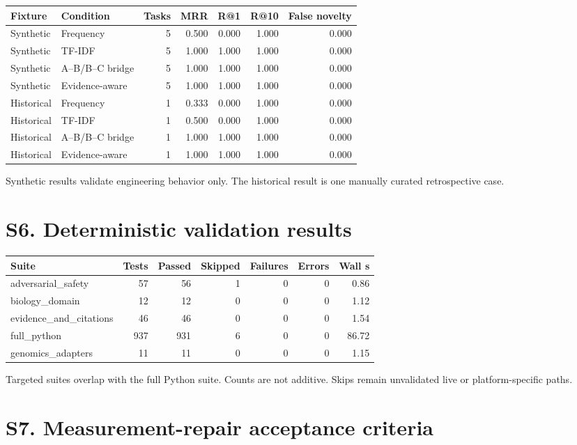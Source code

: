 \documentclass[11pt]{article}
\begin{document}
\begin{tabular*}{\textwidth}{@{\extracolsep{\fill}}llrrrrr}
\toprule
Fixture & Condition & Tasks & MRR & R@1 & R@10 & False novelty \\
\midrule
Synthetic & Frequency & 5 & 0.500 & 0.000 & 1.000 & 0.000 \\
Synthetic & TF-IDF & 5 & 1.000 & 1.000 & 1.000 & 0.000 \\
Synthetic & A--B/B--C bridge & 5 & 1.000 & 1.000 & 1.000 & 0.000 \\
Synthetic & Evidence-aware & 5 & 1.000 & 1.000 & 1.000 & 0.000 \\
Historical & Frequency & 1 & 0.333 & 0.000 & 1.000 & 0.000 \\
Historical & TF-IDF & 1 & 0.500 & 0.000 & 1.000 & 0.000 \\
Historical & A--B/B--C bridge & 1 & 1.000 & 1.000 & 1.000 & 0.000 \\
Historical & Evidence-aware & 1 & 1.000 & 1.000 & 1.000 & 0.000 \\
\bottomrule
\end{tabular*}

Synthetic results validate engineering behavior only. The historical result is one manually curated retrospective case.

\section*{S6. Deterministic validation results}

\begin{tabular*}{\textwidth}{@{\extracolsep{\fill}}lrrrrrr}
\toprule
Suite & Tests & Passed & Skipped & Failures & Errors & Wall s \\
\midrule
adversarial\_safety & 57 & 56 & 1 & 0 & 0 & 0.86 \\
biology\_domain & 12 & 12 & 0 & 0 & 0 & 1.12 \\
evidence\_and\_citations & 46 & 46 & 0 & 0 & 0 & 1.54 \\
full\_python & 937 & 931 & 6 & 0 & 0 & 86.72 \\
genomics\_adapters & 11 & 11 & 0 & 0 & 0 & 1.15 \\
\bottomrule
\end{tabular*}

Targeted suites overlap with the full Python suite. Counts are not additive. Skips remain unvalidated live or platform-specific paths.

\section*{S7. Measurement-repair acceptance criteria}
\end{document}
